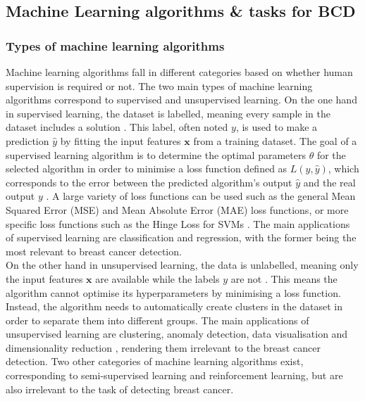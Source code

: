 \subsection{Machine Learning algorithms \& tasks for BCD}

\subsubsection{Types of machine learning algorithms}

Machine learning algorithms fall in different categories based on whether human supervision is required or not. The two main types of machine learning algorithms correspond to supervised and unsupervised learning. On the one hand in supervised learning, the dataset is labelled, meaning every sample in the dataset includes a solution \citep{Geron2019}. This label, often noted $y$, is used to make a prediction $\hat{y}$ by fitting the input features $\textbf{x}$ from a training dataset. The goal of a supervised learning algorithm is to determine the optimal parameters $\theta$ for the selected algorithm in order to minimise a loss function defined as $L(y,\hat{y})$, which corresponds to the error between the predicted algorithm's output $\hat{y}$ and the real output $y$ \citep{Litjens2017}. A large variety of loss functions can be used such as the general Mean Squared Error (MSE) and Mean Absolute Error (MAE) loss functions, or more specific loss functions such as the Hinge Loss for SVMs \citep{Geron2019}. The main applications of supervised learning are classification and regression, with the former being the most relevant to breast cancer detection.\\

On the other hand in unsupervised learning, the data is unlabelled, meaning only the input features $\textbf{x}$ are available while the labels $y$ are not \citep{Litjens2017}. This means the algorithm cannot optimise its hyperparameters by minimising a loss function. Instead, the algorithm needs to automatically create clusters in the dataset in order to separate them into different groups. The main applications of unsupervised learning are clustering, anomaly detection, data visualisation and dimensionality reduction \citep{Geron2019}, rendering them irrelevant to the breast cancer detection. Two other categories of machine learning algorithms exist, corresponding to semi-supervised learning and reinforcement learning, but are also irrelevant to the task of detecting breast cancer.\\

